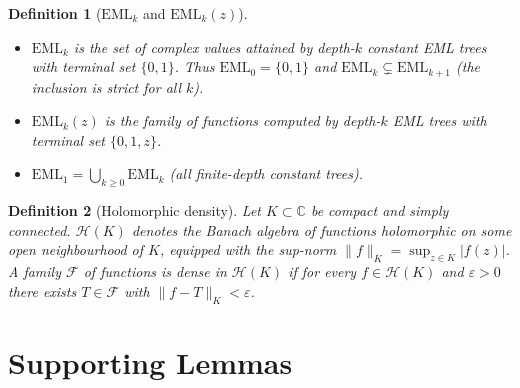 \documentclass[11pt]{article}
\newtheorem{definition}{Definition}
\begin{document}
\begin{definition}[$\mathrm{EML}_k$ and $\mathrm{EML}_k(z)$]
\begin{itemize}
\item $\mathrm{EML}_k$ is the set of complex \emph{values} attained by depth-$k$
  constant EML trees with terminal set $\{0,1\}$.  Thus
  $\mathrm{EML}_0 = \{0,1\}$ and $\mathrm{EML}_k \subsetneq \mathrm{EML}_{k+1}$
  (the inclusion is strict for all $k$).
\item $\mathrm{EML}_k(z)$ is the family of \emph{functions} computed by depth-$k$
  EML trees with terminal set $\{0,1,z\}$.
\item $\mathrm{EML}_1 = \bigcup_{k\ge 0}\mathrm{EML}_k$ (all finite-depth constant
  trees).
\end{itemize}
\end{definition}

\begin{definition}[Holomorphic density]
Let $K \subset \mathbb{C}$ be compact and simply connected.
$\mathcal{H}(K)$ denotes the Banach algebra of functions holomorphic on some open
neighbourhood of $K$, equipped with the sup-norm
$\|f\|_K = \sup_{z \in K} |f(z)|$.
A family $\mathcal{F}$ of functions is \emph{dense in $\mathcal{H}(K)$} if for every
$f \in \mathcal{H}(K)$ and $\varepsilon > 0$ there exists $T \in \mathcal{F}$ with
$\|f - T\|_K < \varepsilon$.
\end{definition}

\section{Supporting Lemmas}
\end{document}
